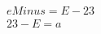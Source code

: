 \documentclass{article}
\begin{document}
\begin{align*}
    eMinus = E - 23 \\
    23 - E = a
\end{align*}
\end{document}
